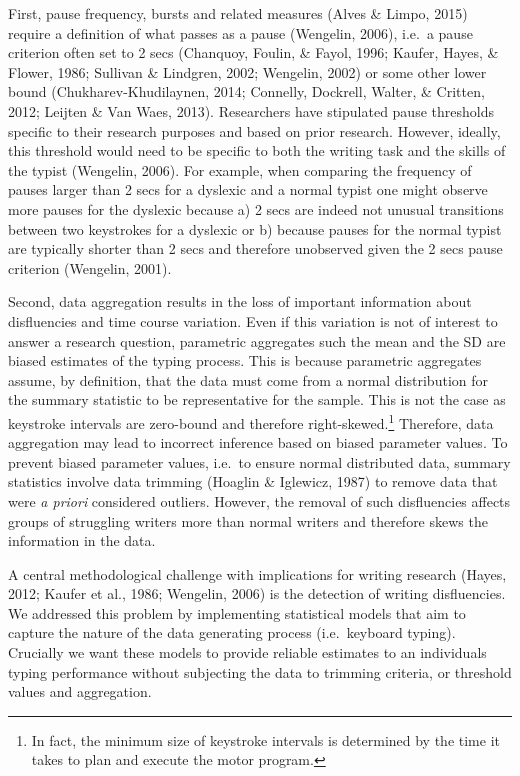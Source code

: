 \documentclass[english,man,floatsintext]{apa7}
\begin{document}
First, pause frequency, bursts and related measures (Alves \& Limpo, 2015) require a definition of what passes as a pause (Wengelin, 2006), i.e.~a pause criterion often set to 2 secs (Chanquoy, Foulin, \& Fayol, 1996; Kaufer, Hayes, \& Flower, 1986; Sullivan \& Lindgren, 2002; Wengelin, 2002) or some other lower bound (Chukharev-Khudilaynen, 2014; Connelly, Dockrell, Walter, \& Critten, 2012; Leijten \& Van Waes, 2013). Researchers have stipulated pause thresholds specific to their research purposes and based on prior research. However, ideally, this threshold would need to be specific to both the writing task and the skills of the typist (Wengelin, 2006). For example, when comparing the frequency of pauses larger than 2 secs for a dyslexic and a normal typist one might observe more pauses for the dyslexic because a) 2 secs are indeed not unusual transitions between two keystrokes for a dyslexic or b) because pauses for the normal typist are typically shorter than 2 secs and therefore unobserved given the 2 secs pause criterion (Wengelin, 2001).

Second, data aggregation results in the loss of important information about disfluencies and time course variation. Even if this variation is not of interest to answer a research question, parametric aggregates such the mean and the SD are biased estimates of the typing process. This is because parametric aggregates assume, by definition, that the data must come from a normal distribution for the summary statistic to be representative for the sample. This is not the case as keystroke intervals are zero-bound and therefore right-skewed.\footnote{In fact, the minimum size of keystroke intervals is determined by the time it takes to plan and execute the motor program.} Therefore, data aggregation may lead to incorrect inference based on biased parameter values. To prevent biased parameter values, i.e.~to ensure normal distributed data, summary statistics involve data trimming (Hoaglin \& Iglewicz, 1987) to remove data that were \emph{a priori} considered outliers. However, the removal of such disfluencies affects groups of struggling writers more than normal writers and therefore skews the information in the data.

A central methodological challenge with implications for writing research (Hayes, 2012; Kaufer et al., 1986; Wengelin, 2006) is the detection of writing disfluencies. We addressed this problem by implementing statistical models that aim to capture the nature of the data generating process (i.e.~keyboard typing). Crucially we want these models to provide reliable estimates to an individuals typing performance without subjecting the data to trimming criteria, or threshold values and aggregation.
\end{document}
